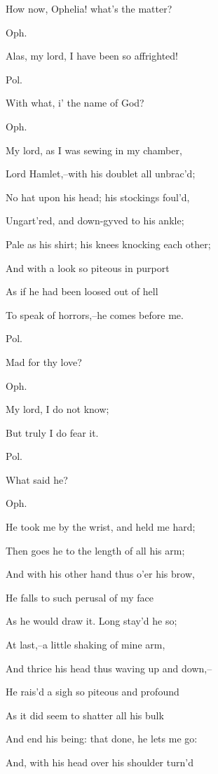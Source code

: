 \documentclass[12pt]{book}
\begin{document}
How now, Ophelia! what's the matter?



Oph.

Alas, my lord, I have been so affrighted!



Pol.

With what, i' the name of God?



Oph.

My lord, as I was sewing in my chamber,

Lord Hamlet,--with his doublet all unbrac'd;

No hat upon his head; his stockings foul'd,

Ungart'red, and down-gyved to his ankle;

Pale as his shirt; his knees knocking each other;

And with a look so piteous in purport

As if he had been loosed out of hell

To speak of horrors,--he comes before me.



Pol.

Mad for thy love?



Oph.

My lord, I do not know;

But truly I do fear it.



Pol.

What said he?



Oph.

He took me by the wrist, and held me hard;

Then goes he to the length of all his arm;

And with his other hand thus o'er his brow,

He falls to such perusal of my face

As he would draw it. Long stay'd he so;

At last,--a little shaking of mine arm,

And thrice his head thus waving up and down,--

He rais'd a sigh so piteous and profound

As it did seem to shatter all his bulk

And end his being: that done, he lets me go:

And, with his head over his shoulder turn'd
\end{document}
